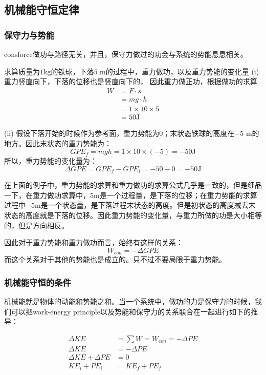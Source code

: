 \subsection*{机械能守恒定律}
\subsubsection*{保守力与势能}
\gls{consforce}做功与路径无关，并且，保守力做过的功会与系统的势能息息相关。

\begin{ExampleBox}
求算质量为$1$\si{\kg}的铁球，下落$5$ \si{\m}的过程中，重力做功，以及重力势能的变化量
\tcblower
(i) 重力竖直向下，下落的位移也是竖直向下的， 因此重力做正功，根据做功的求算
\begin{align*}
	W &= F\cdot s\\
	  &=mg \cdot h\\
	  &=1\times 10 \times 5\\
	  &=50 \si{\J}
\end{align*}

(ii) 假设下落开始的时候作为参考面，重力势能为0；末状态铁球的高度在$-5$ \si{\m}的地方。因此末状态的重力势能为：
\[
	GPE_f = mgh =1\times 10\times (-5) = -50\si{\J}
\]
所以，重力势能的变化量为：
\[
	\Delta GPE = GPE_f-GPE_i =-50-0 =-50\si{\J}
\]
\end{ExampleBox}
在上面的例子中，重力势能的求算和重力做功的求算公式几乎是一致的，但是细品一下，在重力做功求算中，$5$\si{\m}是一个过程量，是下落的位移；在重力势能的求算过程中$-5$\si{\m}是一个状态量，是下落过程末状态的高度。但是初状态的高度减去末状态的高度就是下落的位移。因此重力势能的变化量，与重力所做的功是大小相等的，但是方向相反。

因此对于重力势能和重力做功而言，始终有这样的关系：
\[
	W_{con} =-\Delta GPE
\]
而这个关系对于其他的势能也是成立的。只不过不要局限于重力势能。

\subsubsection*{机械能守恒的条件}
机械能就是物体的动能和势能之和。当一个系统中，做功的力是保守力的时候，我们可以把work-energy principle以及势能和保守力的关系联合在一起进行如下的推导：

\begin{align*}
  \Delta KE  &= \sum W =W_{con} = -\Delta PE\\
  \Delta KE  &=-\Delta PE\\
  \Delta KE +\Delta PE &=0\\
  KE_i+PE_i &= KE_f+PE_f
\end{align*}

